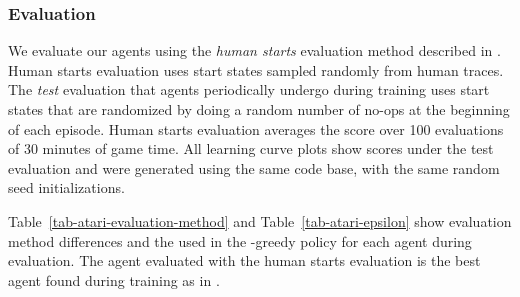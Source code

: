 \documentclass[a4paper]{article}
\begin{document}
\begin{table*}[!hp]
\centering


\caption{
\label{tab-atari-best-agent-hyperparameters}
Chosen hyperparameters for prioritized variants of DQN.  Arrows indicate linear annealing, where the limiting value is reached at the end of training.  Note the rank-based variant with DQN as the baseline is an early version without IS.  Here, the bias introduced by prioritized replay was instead corrected by annealing  to zero.
}
\end{table*}


\subsubsection{Evaluation}
\label{sec-evaluation}

We evaluate our agents using the \emph{human starts} evaluation method described in \citep{double-dqn}.  Human starts evaluation uses start states sampled randomly from human traces.  The \emph{test} evaluation that agents periodically undergo during training uses start states that are randomized by doing a random number of no-ops at the beginning of each episode.  Human starts evaluation averages the score over 100 evaluations of 30 minutes of game time.  All learning curve plots show scores under the test evaluation and were generated using the same code base, with the same random seed initializations.

Table~\ref{tab-atari-evaluation-method} and Table~\ref{tab-atari-epsilon} show evaluation method differences and the  used in the -greedy policy for each agent during evaluation.  The agent evaluated with the human starts evaluation is the best agent found during training as in \citep{double-dqn}.
\end{document}
